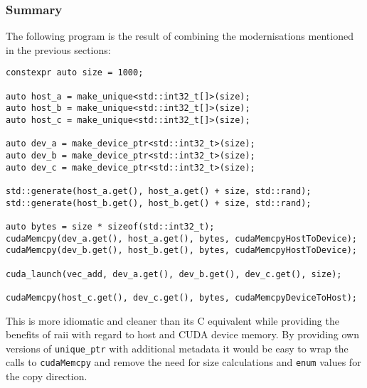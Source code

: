 \subsubsection{Summary}\label{modern:vec_add:summary}

The following program is the result of combining the modernisations mentioned in the previous sections:

\begin{verbatim}
constexpr auto size = 1000;

auto host_a = make_unique<std::int32_t[]>(size);
auto host_b = make_unique<std::int32_t[]>(size);
auto host_c = make_unique<std::int32_t[]>(size);

auto dev_a = make_device_ptr<std::int32_t>(size);
auto dev_b = make_device_ptr<std::int32_t>(size);
auto dev_c = make_device_ptr<std::int32_t>(size);

std::generate(host_a.get(), host_a.get() + size, std::rand);
std::generate(host_b.get(), host_b.get() + size, std::rand);

auto bytes = size * sizeof(std::int32_t);
cudaMemcpy(dev_a.get(), host_a.get(), bytes, cudaMemcpyHostToDevice);
cudaMemcpy(dev_b.get(), host_b.get(), bytes, cudaMemcpyHostToDevice);

cuda_launch(vec_add, dev_a.get(), dev_b.get(), dev_c.get(), size);

cudaMemcpy(host_c.get(), dev_c.get(), bytes, cudaMemcpyDeviceToHost);
\end{verbatim}

\noindent This is more idiomatic and cleaner than its C equivalent while providing the benefits of \gls{raii} with regard to host and CUDA device memory. By providing own versions of \texttt{unique\_ptr} with additional metadata it would be easy to wrap the calls to \texttt{cudaMemcpy} and remove the need for size calculations and \texttt{enum} values for the copy direction.